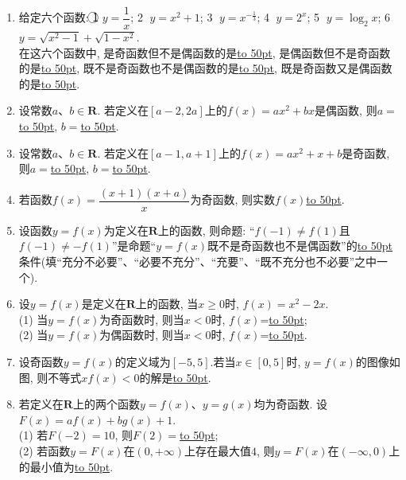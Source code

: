 \documentclass[10pt,a4paper]{article}
\newcommand{\blank}[1]{\underline{\hbox to #1pt{}}}
\begin{document}
\begin{enumerate}[1.]
\item 给定六个函数: \textcircled{1} $y=\dfrac 1x$; \textcircled{2} $y=x^2+1$; \textcircled{3} $y={x^{-\frac 13}}$; \textcircled{4} $y=2^x$; \textcircled{5} $y=\log_2x$; \textcircled{6} $y=\sqrt{x^2-1}+\sqrt{1-x^2}$.\\
在这六个函数中, 是奇函数但不是偶函数的是\blank{50}, 是偶函数但不是奇函数的是\blank{50}, 既不是奇函数也不是偶函数的是\blank{50}, 既是奇函数又是偶函数的是\blank{50}.
\item 设常数$a$、$b\in \mathbf{R}$. 若定义在$[a-2,2a]$上的$f(x)=ax^2+bx$是偶函数, 则$a=$\blank{50}, $b=$\blank{50}.
\item 设常数$a$、$b\in \mathbf{R}$. 若定义在$[a-1,a+1]$上的$f(x)=ax^2+x+b$是奇函数, 则$a=$\blank{50}, $b=$\blank{50}.
\item 若函数$f(x)=\dfrac{(x+1)(x+a)}x$为奇函数, 则实数$f(x)$\blank{50}.
\item 设函数$y=f(x)$为定义在$\mathbf{R}$上的函数, 则命题: ``$f(-1)\ne f(1)$且$f(-1)\ne -f(1)$''是命题``$y=f(x)$既不是奇函数也不是偶函数''的\blank{50}条件(填``充分不必要''、``必要不充分''、``充要''、``既不充分也不必要''之中一个).
\item 设$y=f(x)$是定义在$\mathbf{R}$上的函数, 当$x\ge 0$时, $f(x)=x^2-2x$.\\
(1) 当$y=f(x)$为奇函数时, 则当$x<0$时, $f(x)$=\blank{50};\\
(2) 当$y=f(x)$为偶函数时, 则当$x<0$时, $f(x)$=\blank{50}.
\item 设奇函数$y=f(x)$的定义域为$[-5, 5]$.若当$x\in [0,5]$时, $y=f(x)$的图像如图, 则不等式$xf(x)<0$的解是\blank{50}.
\begin{center}
\end{center}
\item 若定义在$\mathbf{R}$上的两个函数$y=f(x)$、$y=g(x)$均为奇函数. 设$F(x)=af(x)+bg(x)+1$.\\
(1) 若$F(-2)=10$, 则$F(2)=$\blank{50};\\
(2) 若函数$y=F(x)$在$(0,+\infty)$上存在最大值$4$, 则$y=F(x)$在$(-\infty ,0)$上的最小值为\blank{50}.

\end{enumerate}
\end{document}
